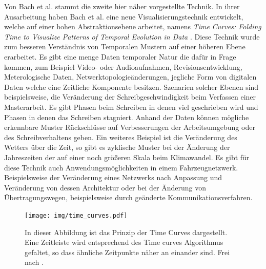 \documentclass[draft=false
              ,paper=a4
              ,twoside=false
              ,fontsize=11pt
              ,headsepline
              ,BCOR10mm
              ,DIV11
              ]{scrbook}
\begin{document}

Von Bach et al. stammt die zweite hier näher vorgestellte Technik. In ihrer Ausarbeitung haben Bach et al. eine neue Visualisierungstechnik entwickelt, welche auf einer hohen Abstraktionsebene arbeitet, namens \textit{Time Curves: Folding Time to Visualize Patterns of Temporal Evolution in Data} \cite{bach_time_2016}. Diese Technik wurde zum besseren Verständnis von Temporalen Mustern auf einer höheren Ebene erarbeitet. Es gibt eine menge Daten temporaler Natur die dafür in Frage kommen, zum Beispiel Video- oder Audioaufnahmen, Revisionsentwicklung, Meterologische Daten, Netwerktopologieänderungen, jegliche Form von digitalen Daten welche eine Zeitliche Komponente besitzen. Szenarien solcher Ebenen sind beispielsweise, die Veränderung der Schreibgeschwindigkeit beim Verfassen einer Masterarbeit. Es gibt Phasen beim Schreiben in denen viel geschrieben wird und Phasen in denen das Schreiben stagniert. Anhand der Daten können mögliche erkennbare Muster Rückschlüsse auf Verbesserungen der Arbeitsumgebung oder des Schreibverhaltens geben. Ein weiteres Beispiel ist die Veränderung des Wetters über die Zeit, so gibt es zyklische Muster bei der Änderung der Jahreszeiten der auf einer noch größeren Skala beim Klimawandel. Es gibt für diese Technik auch Anwendungsmöglichkeiten in einem Fahrzeugnetzwerk. Beispielsweise der Veränderung eines Netzwerks nach Anpassung und Veränderung von dessen Architektur oder bei der Änderung von Übertragungswegen, beispielsweise durch geänderte Kommunikationsverfahren. 

\begin{figure}[htbp]
  \centering
  \texttt{[image: img/time\_curves.pdf]}
  \caption{In dieser Abbildung ist das Prinzip der Time Curves dargestellt. Eine Zeitleiste wird entsprechend des Time curves Algorithmus gefaltet, so dass ähnliche Zeitpunkte näher an einander sind. Frei nach \cite{bach_time_2016}.}
  \label{fig:time_curves}
\end{figure}
\end{document}
